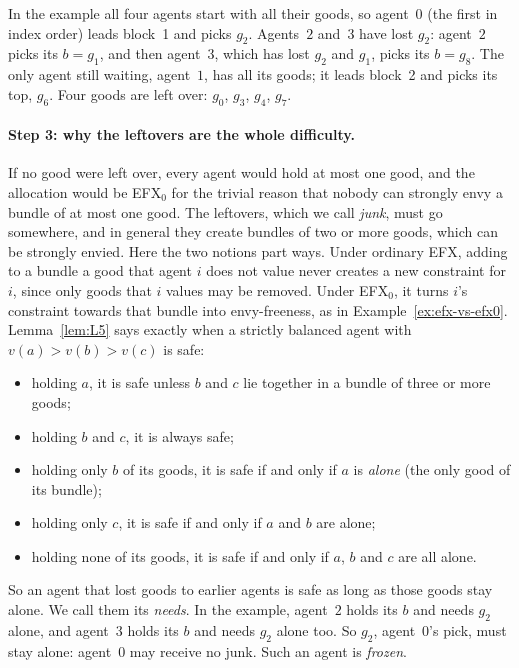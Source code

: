 \documentclass[runningheads,11pt]{llncs}
\newcommand{\efxz}{\texorpdfstring{\mbox{EFX$_0$}}{EFX0}}
\begin{document}
In the example all four agents start with all their goods, so agent~$0$ (the first in index order) leads block~1 and picks $g_2$. Agents~$2$ and~$3$ have lost $g_2$: agent~$2$ picks its $b=g_1$, and then agent~$3$, which has lost $g_2$ and $g_1$, picks its $b=g_8$. The only agent still waiting, agent~$1$, has all its goods; it leads block~2 and picks its top, $g_6$. Four goods are left over: $g_0$, $g_3$, $g_4$, $g_7$.

\paragraph{Step 3: why the leftovers are the whole difficulty.} If no good were left over, every agent would hold at most one good, and the allocation would be \efxz{} for the trivial reason that nobody can strongly envy a bundle of at most one good. The leftovers, which we call \emph{junk}, must go somewhere, and in general they create bundles of two or more goods, which can be strongly envied. Here the two notions part ways. Under ordinary EFX, adding to a bundle a good that agent $i$ does not value never creates a new constraint for $i$, since only goods that $i$ values may be removed. Under \efxz{}, it turns $i$'s constraint towards that bundle into envy-freeness, as in Example~\ref{ex:efx-vs-efx0}. Lemma~\ref{lem:L5} says exactly when a strictly balanced agent with $v(a)>v(b)>v(c)$ is safe:
\begin{itemize}
\item holding $a$, it is safe unless $b$ and $c$ lie together in a bundle of three or more goods;
\item holding $b$ and $c$, it is always safe;
\item holding only $b$ of its goods, it is safe if and only if $a$ is \emph{alone} (the only good of its bundle);
\item holding only $c$, it is safe if and only if $a$ and $b$ are alone;
\item holding none of its goods, it is safe if and only if $a$, $b$ and $c$ are all alone.
\end{itemize}
So an agent that lost goods to earlier agents is safe as long as those goods stay alone. We call them its \emph{needs}. In the example, agent~$2$ holds its $b$ and needs $g_2$ alone, and agent~$3$ holds its $b$ and needs $g_2$ alone too. So $g_2$, agent~$0$'s pick, must stay alone: agent~$0$ may receive no junk. Such an agent is \emph{frozen}.
\end{document}
